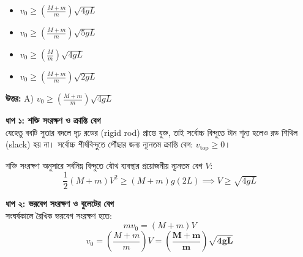 \documentclass[12pt, a4paper]{article}
\begin{document}
{{\begin{center}
\end{center}
\vspace{1em}

\begin{itemize}[label={}, leftmargin=1cm, itemsep=0.5em]
    \item[\textbf{A)}] $v_0 \ge \left(\frac{M + m}{m}\right) \sqrt{4 g L}$
    \item[\textbf{B)}] $v_0 \ge \left(\frac{M + m}{m}\right) \sqrt{5 g L}$
    \item[\textbf{C)}] $v_0 \ge \left(\frac{M}{m}\right) \sqrt{4 g L}$
    \item[\textbf{D)}] $v_0 \ge \left(\frac{M + m}{m}\right) \sqrt{2 g L}$
\end{itemize}

\vspace{0.5em}
\begin{tcolorbox}[answerbox]
    \textbf{\color{success} উত্তর:} A) $v_0 \ge \left(\frac{M + m}{m}\right) \sqrt{4 g L}$
\end{tcolorbox}
\vspace{1em}

\begin{tcolorbox}[solutionbox={সমাধান (Solution)}]
    \noindent
    \textbf{ধাপ ১: শক্তি সংরক্ষণ ও ক্রান্তি বেগ} \\
    যেহেতু ববটি সুতার বদলে দৃঢ় রডের (rigid rod) প্রান্তে যুক্ত, তাই সর্বোচ্চ বিন্দুতে টান শূন্য হলেও রড শিথিল (slack) হয় না। সর্বোচ্চ শীর্ষবিন্দুতে পৌঁছার জন্য ন্যূনতম ক্রান্তি বেগ: $v_{\text{top}} \ge 0$।
    
    শক্তি সংরক্ষণ অনুসারে সর্বনিম্ন বিন্দুতে যৌথ ব্যবস্থার প্রয়োজনীয় ন্যূনতম বেগ $V$:
    \[ \frac{1}{2} (M + m) V^2 \ge (M + m) g (2L) \implies V \ge \sqrt{4 g L} \]
    
    \vspace{0.5em}
    \noindent\textbf{ধাপ ২: ভরবেগ সংরক্ষণ ও বুলেটের বেগ} \\
    সংঘর্ষকালে রৈখিক ভরবেগ সংরক্ষণ হতে:
    \[ m v_0 = (M + m) V \]
    \[ v_0 = \left(\frac{M + m}{m}\right) V = \mathbf{\left(\frac{M + m}{m}\right) \sqrt{4 g L}} \]
\end{tcolorbox}

}}
\end{document}
